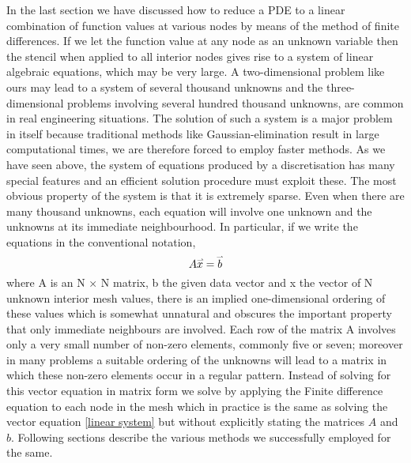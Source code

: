 In the last section we have discussed how to reduce a PDE to a linear combination of function values at various nodes by means of the method of finite differences. If we let the function value at any node as an unknown variable then the stencil when applied to all interior nodes gives rise to a system of linear algebraic equations, which may be very large. A two-dimensional problem like ours may lead to a system of several thousand unknowns and the three-dimensional problems involving several hundred thousand unknowns, are common in real engineering situations. The solution of such a system is a major problem in itself because traditional methods like Gaussian-elimination result in large computational times, we are therefore forced to employ faster methods. As we have seen above, the system of equations produced by a discretisation has many special features and an eﬃcient solution procedure must exploit these. The most obvious property of the system is that it is extremely sparse. Even when there are many thousand unknowns, each equation will involve one unknown and the unknowns at its immediate neighbourhood. In particular, if we write the equations in the conventional notation,
\begin{equation} \label{linear system}
    A \accentset{\rightharpoonup}{x} = \accentset{\rightharpoonup}{b} 
\end{equation}
where A is an N × N matrix, b the given data vector and x the vector of N unknown interior mesh values, there is an implied one-dimensional ordering of these values which is somewhat unnatural and obscures the important property that only immediate neighbours are involved. Each row of the matrix A involves only a very small number of non-zero elements, commonly ﬁve or seven; moreover in many problems a suitable ordering of the unknowns will lead to a matrix in which these non-zero elements occur in a regular pattern. Instead of solving for this vector equation in matrix form we solve by applying the Finite difference equation to each node in the mesh which in practice is the same as solving the vector equation \ref{linear system} but without explicitly stating the matrices $A$ and $b$. Following sections describe the various methods we successfully employed for the same.\autocite{mortonpde}\autocite{tudortmundkuzmin}
